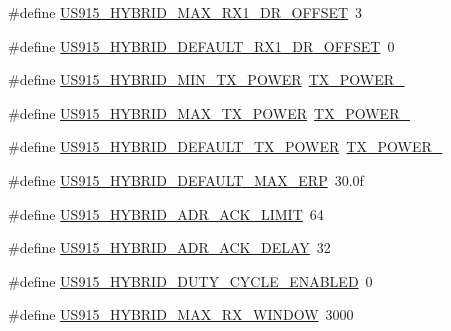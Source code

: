 \begin{DoxyCompactItemize}
\item 
\#define \mbox{\hyperlink{group___r_e_g_i_o_n_u_s915_h_y_b_ga1e70e7e114c0fd6bf905085e78def426}{U\+S915\+\_\+\+H\+Y\+B\+R\+I\+D\+\_\+\+M\+A\+X\+\_\+\+R\+X1\+\_\+\+D\+R\+\_\+\+O\+F\+F\+S\+ET}}~3
\item 
\#define \mbox{\hyperlink{group___r_e_g_i_o_n_u_s915_h_y_b_ga314e35b76742b3b9ba602e5e2bbcba3f}{U\+S915\+\_\+\+H\+Y\+B\+R\+I\+D\+\_\+\+D\+E\+F\+A\+U\+L\+T\+\_\+\+R\+X1\+\_\+\+D\+R\+\_\+\+O\+F\+F\+S\+ET}}~0
\item 
\#define \mbox{\hyperlink{group___r_e_g_i_o_n_u_s915_h_y_b_ga0aece8c836bf5bf19a28589cb3cda70e}{U\+S915\+\_\+\+H\+Y\+B\+R\+I\+D\+\_\+\+M\+I\+N\+\_\+\+T\+X\+\_\+\+P\+O\+W\+ER}}~\mbox{\hyperlink{group___r_e_g_i_o_n_gac9747c69350f34d485c3134e5a57655b}{T\+X\+\_\+\+P\+O\+W\+E\+R\+\_}}
\item 
\#define \mbox{\hyperlink{group___r_e_g_i_o_n_u_s915_h_y_b_ga94a1ed1e5cca1f05f0ac4916e164f529}{U\+S915\+\_\+\+H\+Y\+B\+R\+I\+D\+\_\+\+M\+A\+X\+\_\+\+T\+X\+\_\+\+P\+O\+W\+ER}}~\mbox{\hyperlink{group___r_e_g_i_o_n_gab33618449f2a573142c463ab071ef8ed}{T\+X\+\_\+\+P\+O\+W\+E\+R\+\_}}
\item 
\#define \mbox{\hyperlink{group___r_e_g_i_o_n_u_s915_h_y_b_gac33efe45e6e9b5ac53a97b4ed314c28e}{U\+S915\+\_\+\+H\+Y\+B\+R\+I\+D\+\_\+\+D\+E\+F\+A\+U\+L\+T\+\_\+\+T\+X\+\_\+\+P\+O\+W\+ER}}~\mbox{\hyperlink{group___r_e_g_i_o_n_gab33618449f2a573142c463ab071ef8ed}{T\+X\+\_\+\+P\+O\+W\+E\+R\+\_}}
\item 
\#define \mbox{\hyperlink{group___r_e_g_i_o_n_u_s915_h_y_b_gac045f9e8230d0740b4676fbade801432}{U\+S915\+\_\+\+H\+Y\+B\+R\+I\+D\+\_\+\+D\+E\+F\+A\+U\+L\+T\+\_\+\+M\+A\+X\+\_\+\+E\+RP}}~30.\+0f
\item 
\#define \mbox{\hyperlink{group___r_e_g_i_o_n_u_s915_h_y_b_ga1a479117e6e72786f00838f96288ecfd}{U\+S915\+\_\+\+H\+Y\+B\+R\+I\+D\+\_\+\+A\+D\+R\+\_\+\+A\+C\+K\+\_\+\+L\+I\+M\+IT}}~64
\item 
\#define \mbox{\hyperlink{group___r_e_g_i_o_n_u_s915_h_y_b_gad0a445c397f7510c7ebdca13b5197389}{U\+S915\+\_\+\+H\+Y\+B\+R\+I\+D\+\_\+\+A\+D\+R\+\_\+\+A\+C\+K\+\_\+\+D\+E\+L\+AY}}~32
\item 
\#define \mbox{\hyperlink{group___r_e_g_i_o_n_u_s915_h_y_b_ga7d99e44bc983c9f9e453640cc13712bf}{U\+S915\+\_\+\+H\+Y\+B\+R\+I\+D\+\_\+\+D\+U\+T\+Y\+\_\+\+C\+Y\+C\+L\+E\+\_\+\+E\+N\+A\+B\+L\+ED}}~0
\item 
\#define \mbox{\hyperlink{group___r_e_g_i_o_n_u_s915_h_y_b_ga1420db342d8dc812b2d4f033df8d2a9c}{U\+S915\+\_\+\+H\+Y\+B\+R\+I\+D\+\_\+\+M\+A\+X\+\_\+\+R\+X\+\_\+\+W\+I\+N\+D\+OW}}~3000

\end{DoxyCompactItemize}
